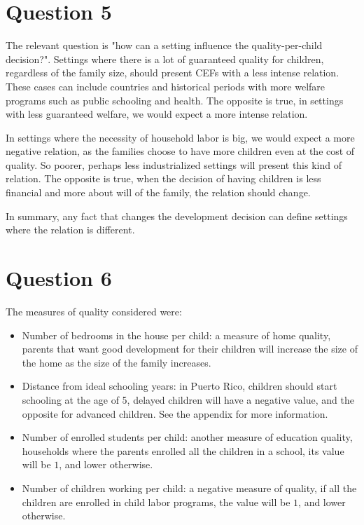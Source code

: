 \documentclass[12pt]{article}
\begin{document}
\section*{Question 5}

The relevant question is "how can a setting influence the quality-per-child decision?". Settings where there is a lot of guaranteed quality for children, regardless of the family size, should present CEFs with a less intense relation. These cases can include countries and historical periods with more welfare programs such as public schooling and health. The opposite is true, in settings with less guaranteed welfare, we would expect a more intense relation.

In settings where the necessity of household labor is big, we would expect a more negative relation, as the families choose to have more children even at the cost of quality. So poorer, perhaps less industrialized settings will present this kind of relation. The opposite is true, when the decision of having children is less financial and more about will of the family, the relation should change.

In summary, any fact that changes the development decision can define settings where the relation is different.


\section*{Question 6}

The measures of quality considered were:

\begin{itemize}
    \item Number of bedrooms in the house per child: a measure of home quality, parents that want good development for their children will increase the size of the home as the size of the family increases.
    \item Distance from ideal schooling years: in Puerto Rico, children should start schooling at the age of 5, delayed children will have a negative value, and the opposite for advanced children. See the appendix for more information.
    \item Number of enrolled students per child: another measure of education quality, households where the parents enrolled all the children in a school, its value will be $1$, and lower otherwise.
    \item Number of children working per child: a negative measure of quality, if all the children are enrolled in child labor programs, the value will be $1$, and lower otherwise.
\end{itemize}
\end{document}
